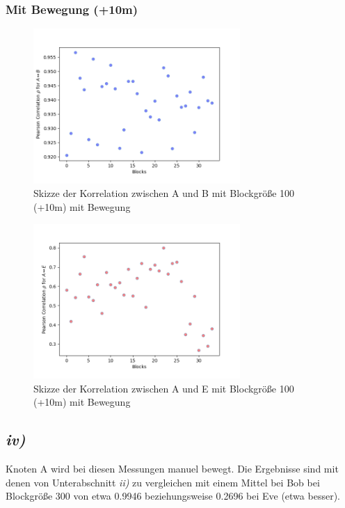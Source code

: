 \documentclass[12pt,a4paper]{article}
\begin{document}
\subsubsection*{Mit Bewegung (+10m)}


\begin{figure}[hbt!]
	\centering
		\includegraphics[width=0.7\textwidth ]
		{Bilder/a3-t3b-mb-block100-correlation-AB.png}
		\caption{Skizze der Korrelation zwischen A und B mit Blockgröße 100 (+10m) mit Bewegung}
		\label{fig:Label14}
\end{figure}

\begin{figure}[hbt!]
	\centering
		\includegraphics[width=0.7\textwidth ]
		{Bilder/a3-t3b-mb-block100-correlation-AE.png}
		\caption{Skizze der Korrelation zwischen A und E mit Blockgröße 100 (+10m) mit Bewegung}
		\label{fig:Label15}
\end{figure}


\subsection*{\textit{iv)}}

Knoten A wird bei diesen Messungen manuel bewegt. Die Ergebnisse
sind mit denen von Unterabschnitt \textit{ii)} zu vergleichen mit 
einem Mittel bei Bob bei Blockgröße 300 von etwa 0.9946 
beziehungsweise 0.2696 bei Eve (etwa besser).
\end{document}
